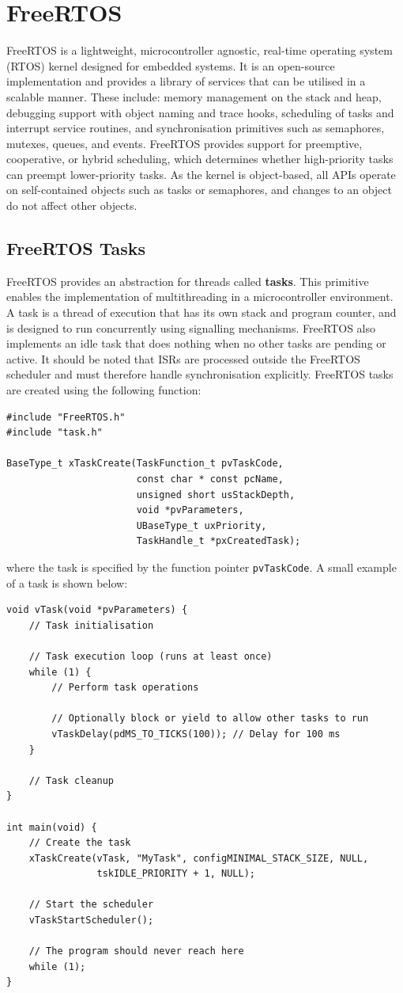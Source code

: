 \documentclass{article}
\begin{document}
\section{FreeRTOS}
FreeRTOS is a lightweight, microcontroller agnostic, real-time
operating system (RTOS) kernel designed for embedded systems. It is an
open-source implementation and provides a library of services that can
be utilised in a scalable manner. These include: memory management on
the stack and heap, debugging support with object naming and trace
hooks, scheduling of tasks and interrupt service routines, and
synchronisation primitives such as semaphores, mutexes, queues, and
events. FreeRTOS provides support for preemptive, cooperative, or
hybrid scheduling, which determines whether high-priority tasks can
preempt lower-priority tasks. As the kernel is object-based, all APIs
operate on self-contained objects such as tasks or semaphores, and
changes to an object do not affect other objects.
\subsection{FreeRTOS Tasks}
FreeRTOS provides an abstraction for threads called \textbf{tasks}.
This primitive enables the implementation of multithreading in a
microcontroller environment. A task is a thread of execution that has
its own stack and program counter, and is designed to run concurrently
using signalling mechanisms. FreeRTOS also implements an idle task that
does nothing when no other tasks are pending or active. It should be
noted that ISRs are processed outside the FreeRTOS scheduler and must
therefore handle synchronisation explicitly. FreeRTOS tasks are created
using the following function:
\begin{verbatim}
#include "FreeRTOS.h"
#include "task.h"

BaseType_t xTaskCreate(TaskFunction_t pvTaskCode,
                       const char * const pcName,
                       unsigned short usStackDepth,
                       void *pvParameters,
                       UBaseType_t uxPriority,
                       TaskHandle_t *pxCreatedTask);
\end{verbatim}
where the task is specified by the function pointer
\texttt{pvTaskCode}. A small example of a task is shown below:
\begin{verbatim}
void vTask(void *pvParameters) {
    // Task initialisation

    // Task execution loop (runs at least once)
    while (1) {
        // Perform task operations

        // Optionally block or yield to allow other tasks to run
        vTaskDelay(pdMS_TO_TICKS(100)); // Delay for 100 ms
    }

    // Task cleanup
}

int main(void) {
    // Create the task
    xTaskCreate(vTask, "MyTask", configMINIMAL_STACK_SIZE, NULL,
                tskIDLE_PRIORITY + 1, NULL);

    // Start the scheduler
    vTaskStartScheduler();

    // The program should never reach here
    while (1);
}
\end{verbatim}
\end{document}
